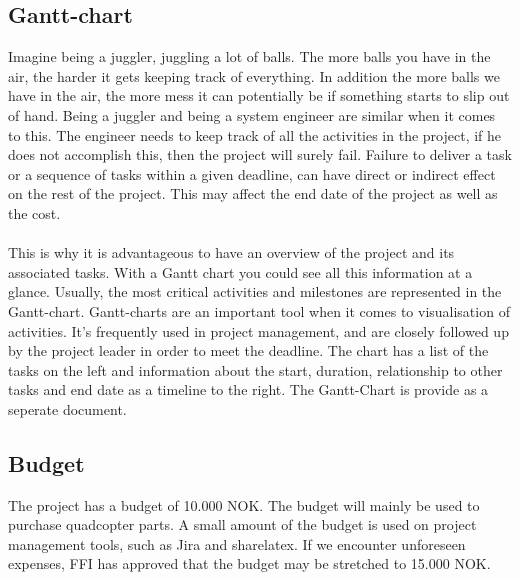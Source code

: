 \subsection{Gantt-chart}

Imagine being a juggler, juggling a lot of balls. The more balls you have in the air, the harder it gets keeping track of everything. In addition the more balls we have in the air, the more mess it can potentially be if something starts to slip out of hand. Being a juggler and being a system engineer are similar when it comes to this. The engineer needs to keep track of all the activities in the project, if he does not accomplish this, then the project will surely fail. Failure to deliver a task or a sequence of tasks within a given deadline, can have direct or indirect effect on the rest of the project. This may affect the end date of the project as well as the cost.\\
\\
This is why it is advantageous to have an overview of the project and its associated tasks. With a Gantt chart you could see all this information at a glance. Usually, the most critical activities and milestones are represented in the Gantt-chart. Gantt-charts are an important tool when it comes to visualisation of activities. It's frequently used in project management, and are closely followed up by the project leader in order to meet the deadline. The chart has a list of the tasks on the left and information about the start, duration, relationship to other tasks and end date as a timeline to the right. The Gantt-Chart is provide as a seperate document. \\

\subsection{Budget}
The project has a budget of 10.000 NOK. The budget will mainly be used to purchase quadcopter parts. A small amount of the budget is used on project management tools, such as Jira and sharelatex. If we encounter unforeseen expenses, FFI has approved that the budget may be stretched to 15.000 NOK.
\\\\

